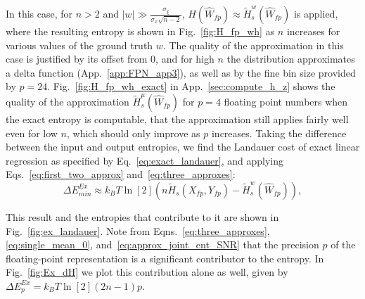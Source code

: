 \documentclass[12pt,onecolumn, margin=1in]{IEEEtran}
\newcommand{\paren}[1]{\left( #1 \right)}
\newcommand{\Wh}{\hat{W}}
\newcommand{\sigx}{\sigma_x}
\newcommand{\sigxi}{\sigma_\xi}
\newcommand{\Ht}{\tilde{H}}
\begin{document}
In this case, for $n > 2$ and $|w| \gg \frac{\sigxi}{\sigx\sqrt{n-2}}$, $H(\Wh_{fp}) \approx \Ht_s^w(\Wh_{fp})$ is applied, where the resulting entropy is shown in Fig.~\ref{fig:H_fp_wh} as $n$ increases for various values of the ground truth $w$. The quality of the approximation in this case is justified by its offset from 0, and for high $n$ the distribution approximates a delta function (App.~\ref{app:FPN_app3}), as well as by the fine bin size provided by $p=24$. Fig.~\ref{fig:H_fp_wh_exact} in App.~\ref{sec:compute_h_z} shows the quality of the approximation $\Ht^\mu_s(\Wh_{fp})$ for $p=4$ floating point numbers when the exact entropy is computable, that the approximation still applies fairly well even for low $n$, which should only improve as $p$ increases. Taking the difference between the input and output entropies, we find the Landauer cost of exact linear regression as specified by Eq.~\eqref{eq:exact_landauer}, and applying Eqs.~\eqref{eq:first_two_approx} and~\eqref{eq:three_approxes}:
\begin{equation}
    \Delta E_{min}^{Ex} \approx k_BT\ln[2]\paren{n\Ht_s(X_{fp},Y_{fp}) - \Ht^w_{s}(\Wh_{fp})}, \label{eq:landauer_exact_lr}
\end{equation}




This result and the entropies that contribute to it are shown in Fig.~\ref{fig:ex_landauer}. Note from Eqns.~\eqref{eq:three_approxes}, \eqref{eq:single_mean_0}, and~\eqref{eq:approx_joint_ent_SNR} that the precision $p$ of the floating-point representation is a significant contributor to the entropy. In Fig.~\ref{fig:Ex_dH} we plot this contribution alone as well, given by $\Delta E^{Ex}_{p} = k_BT \ln[2](2n - 1)p$.
\end{document}
